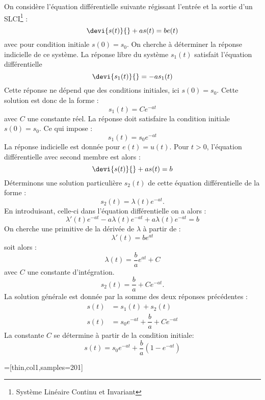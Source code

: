 On considère l'équation différentielle suivante régissant l'entrée
et la sortie d'un SLCI\footnote{Système Linéaire Continu et Invariant} :
$$
\devi{s(t)}{}+as(t)=be(t)
$$
avec pour condition initiale $s(0)=s_0$.
On cherche à déterminer la réponse indicielle de ce système.
La réponse libre du système $s_1(t)$ satisfait l'équation différentielle
$$
\devi{s_1(t)}{}=-as_1(t)
$$
Cette réponse ne dépend que des conditions initiales, ici $s(0)=s_0$.
Cette solution est donc de la forme :
$$
s_1(t)=Ce^{-at}
$$
avec $C$ une constante réel. La réponse doit satisfaire la condition 
initiale $s(0)=s_0$. Ce qui impose :
$$
s_1(t)=s_0e^{-at}
$$
La réponse indicielle est donnée pour $e(t)=u(t)$. Pour $t>0$, l'équation 
différentielle avec second membre est alors :
$$
\devi{s(t)}{}+as(t)=b
$$
Déterminons une solution particulière $s_2(t)$ de cette équation 
différentielle de la forme :
$$
s_2(t)=\lambda(t)e^{-at}.
$$
En introduisant, celle-ci dans l'équation différentielle on a alors :
$$
\lambda'(t)e^{-at}-a\lambda(t)e^{-at}+a\lambda(t)e^{-at}=b
$$
On cherche une primitive de la dérivée de $\lambda$ à partir de :
$$
\lambda'(t)=be^{at}
$$
soit alors :
$$
\lambda(t)=\dfrac{b}{a}e^{at}+C
$$
avec $C$ une constante d'intégration.
$$
s_2(t)=\dfrac{b}{a}+Ce^{-at}.
$$
La solution générale est donnée par la somme des deux réponses précédentes :
\begin{align*}
    s(t)&=s_1(t)+s_2(t)\\
    s(t)&=s_0e^{-at}+\dfrac{b}{a}+Ce^{-at}
\end{align*}
La constante $C$ se détermine à partir de la condition initiale:
$$
s(t)=s_0e^{-at}+\dfrac{b}{a}\left(1-e^{-at}\right)
$$
\begin{center}
=[thin,col1,samples=201]
\end{center}

